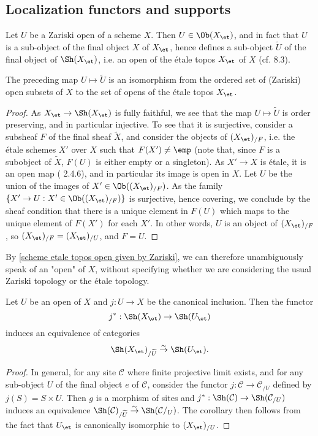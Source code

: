 \subsection{Localization functors and supports}
Let $U$ be a Zariski open of a scheme $X$. Then $U\in\Ob(X_\et)$, and in fact that $U$ is a sub-object of the final object $X$ of $X_\et$, hence defines a sub-object $\widetilde{U}$ of the final object of $\Sh(X_\et)$, i.e. an open of the \'etale topos $X_\et$ of $X$ (cf. \cite{SGA4-1} 8.3).
\begin{proposition}\label{scheme etale topos open given by Zariski}
The preceding map $U\mapsto\widetilde{U}$ is an isomorphism from the ordered set of (Zariski) open subsets of $X$ to the set of opens of the \'etale topos $X_\et$.
\end{proposition}
\begin{proof}
As $X_\et\to\Sh(X_\et)$ is fully faithful, we see that the map $U\mapsto\widetilde{U}$ is order preserving, and in particular injective. To see that it is surjective, consider a subsheaf $F$ of the final sheaf $\widetilde{X}$, and consider the objects of $(X_{\et})_{/F}$, i.e. the \'etale schemes $X'$ over $X$ such that $F(X')\neq\emp$ (note that, since $F$ is a subobject of $\widetilde{X}$, $F(U)$ is either empty or a singleton). As $X'\to X$ is \'etale, it is an open map (\cite{EGA4} 2.4.6), and in particular its image is open in $X$. Let $U$ be the union of the images of $X'\in\Ob((X_{\et})_{/F})$. As the family $\{X'\to U:X'\in\Ob((X_{\et})_{/F})\}$ is surjective, hence covering, we conclude by the sheaf condition that there is a unique element in $F(U)$ which maps to the unique element of $F(X')$ for each $X'$. In other words, $U$ is an object of $(X_{\et})_{/F}$, so $(X_\et)_{/F}=(X_\et)_{/U}$, and $F=U$.
\end{proof}

By \cref{scheme etale topos open given by Zariski}, we can therefore unambiguously speak of an "open" of $X$, without specifying whether we are considering the usual Zariski topology or the \'etale topology.

\begin{corollary}\label{scheme etale topos comma on open char}
Let $U$ be an open of $X$ and $j:U\to X$ be the canonical inclusion. Then the functor 
\[j^*:\Sh(X_\et)\to\Sh(U_\et)\]
induces an equivalence of categories
\[\Sh(X_\et)_{/\widetilde{U}} \stackrel{\sim}{\to} \Sh(U_\et).\]

\end{corollary}
\begin{proof}
In general, for any site $\mathcal{C}$ where finite projective limit exists, and for any sub-object $U$ of the final object $e$ of $\mathcal{C}$, consider the functor $j:\mathcal{C}\to\mathcal{C}_{/U}$ defined by $j(S)=S\times U$. Then $g$ is a morphism of sites and $j^*:\Sh(\mathcal{C})\to\Sh(\mathcal{C}_{/U})$ induces an equivalence $\Sh(\mathcal{C})_{/\widetilde{U}}\stackrel{\sim}{\to}\Sh(\mathcal{C}/_{U})$. The corollary then follows from the fact that $U_\et$ is canonically isomorphic to $(X_\et)_{/U}$.
\end{proof}


